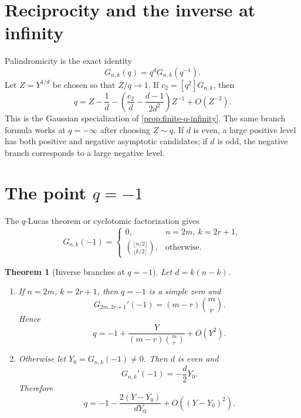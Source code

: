 \documentclass[11pt,a4paper,oneside,openany]{book}
\newtheorem{theorem}{Theorem}[chapter]
\theoremstyle{definition}
\theoremstyle{remark}
\begin{document}
\section{Reciprocity and the inverse at infinity}

Palindromicity is the exact identity
\begin{equation}\label{eq:qbin-reciprocity}
 G_{n,k}(q)=q^dG_{n,k}(q^{-1}).
\end{equation}
Let \(Z=Y^{1/d}\) be chosen so that \(Z/q\to1\).  If \(c_2=[q^2]G_{n,k}\),
then
\begin{equation}\label{eq:qbin-infinity-inverse}
 q=Z-\frac1d
 -\left(\frac{c_2}{d}-\frac{d-1}{2d^2}\right)Z^{-1}
 +O(Z^{-2}).
\end{equation}
This is the Gaussian specialization of
\cref{prop:finite-q-infinity}.  The same branch formula works at
\(q=-\infty\) after choosing \(Z\sim q\).  If \(d\) is even, a large
positive level has both positive and negative asymptotic candidates; if
\(d\) is odd, the negative branch corresponds to a large negative level.

\section{The point \texorpdfstring{$q=-1$}{q=-1}}

The \(q\)-Lucas theorem or cyclotomic factorization gives
\begin{equation}\label{eq:qbin-minus-one-value}
 G_{n,k}(-1)=
 \begin{cases}
 0,&n=2m,\ k=2r+1,\\[2mm]
 \displaystyle\binom{\lfloor n/2\rfloor}{\lfloor k/2\rfloor},&\text{otherwise}.
 \end{cases}
\end{equation}

\begin{theorem}[Inverse branches at \(q=-1\)]\label{thm:qbin-minus-one-inverse}
Let \(d=k(n-k)\).
\begin{enumerate}[label=\textup{(\roman*)}]
\item If \(n=2m\), \(k=2r+1\), then \(q=-1\) is a simple zero and
\begin{equation}\label{eq:qbin-minus-one-zero-slope}
 G_{2m,2r+1}'(-1)=(m-r)\binom mr.
\end{equation}
Hence
\[
 q=-1+\frac{Y}{(m-r)\binom mr}+O(Y^2).
\]
\item Otherwise let \(Y_0=G_{n,k}(-1)\ne0\).  Then \(d\) is even and
\begin{equation}\label{eq:qbin-minus-one-nonzero-slope}
 G_{n,k}'(-1)=-\frac d2Y_0.
\end{equation}
Therefore
\[
 q=-1-\frac{2(Y-Y_0)}{dY_0}+O((Y-Y_0)^2).
\]
\end{enumerate}
\end{theorem}
\end{document}
